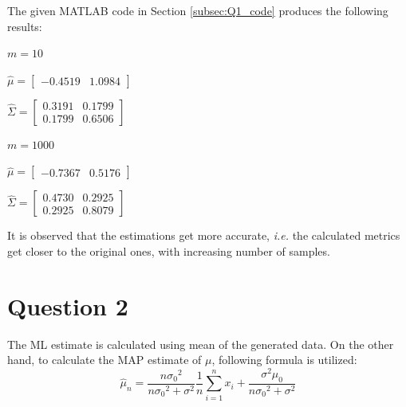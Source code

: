 \documentclass[11pt]{extarticle}
\begin{document}
The given MATLAB code in Section \ref{subsec:Q1_code} produces the following results:\\
\begin{minipage}{0.2\textwidth}
    $m = 10$
\end{minipage}
\begin{minipage}{0.35\textwidth}
    $\hat{\mu} = \begin{bmatrix} -0.4519 & 1.0984 \end{bmatrix}$
\end{minipage}
\begin{minipage}{0.66\textwidth}
    $\hat{\Sigma} = \begin{bmatrix} 0.3191 & 0.1799 \\ 0.1799 & 0.6506 \end{bmatrix}$
\end{minipage}
\begin{minipage}{0.2\textwidth}
    $m = 1000$
\end{minipage}
\begin{minipage}{0.35\textwidth}
    $\hat{\mu} = \begin{bmatrix} -0.7367 & 0.5176 \end{bmatrix}$
\end{minipage}
\begin{minipage}{0.66\textwidth}
    $\hat{\Sigma} = \begin{bmatrix} 0.4730 & 0.2925 \\ 0.2925 & 0.8079 \end{bmatrix}$
\end{minipage}
It is observed that the estimations get more accurate, \textit{i.e.} the calculated metrics get closer to the original ones,  with increasing number of samples.

\section{Question 2}

The ML estimate is calculated using mean of the generated data. On the other hand, to calculate the MAP estimate of $\mu$, following formula is utilized:\\

\begin{equation}
    \label{eq:mu_map}
    {\hat{\mu}}_{n} = \frac{n{\sigma_0}^2}{n{\sigma_0}^2+\sigma^2} \frac{1}{n}\sum_{i=1}^n x_i + \frac{{\sigma}^2\mu_0}{n{\sigma_0}^2+\sigma^2}
\end{equation}
\end{document}
